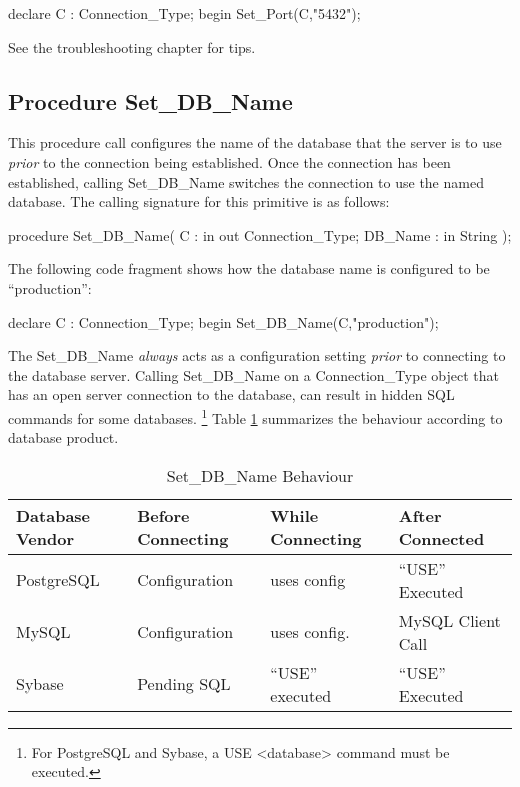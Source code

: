\documentclass[english,letterpaper]{book}
\begin{document}
\begin{Example}
declare
   C : Connection_Type;
begin
   Set_Port(C,"5432");
\end{Example}

See the troubleshooting chapter for tips.

\subsection{Procedure Set\_DB\_Name}

This procedure call configures the name of the database that the server
is to use \emph{prior} to the connection being established. Once
the connection has been established, calling Set\_DB\_Name switches the 
connection to use the named database.
The calling signature for this primitive is as follows:

\begin{Code}
procedure Set_DB_Name(
   C :       in out Connection_Type;
   DB_Name : in     String
);
\end{Code}

The following code fragment shows how the database name is configured
to be ``production'':

\begin{Example}
declare
   C : Connection_Type;
begin
   Set_DB_Name(C,"production");
\end{Example}

The Set\_DB\_Name \emph{always} acts as a configuration setting \emph{prior}
to connecting to the database server. Calling Set\_DB\_Name on a Connection\_Type
object that has an open server connection to the database, can result
in hidden SQL commands for some databases.%
\footnote{For PostgreSQL and Sybase, a USE <database> command must be executed.%
} Table \ref{t:setdb} summarizes the behaviour according to database product.

\begin{table}
   \begin{center}
      \begin{tabular}{llll}
      Database Vendor   &  Before Connecting &  While Connecting           &  After Connected\\
      \hline 
      PostgreSQL        &  Configuration     &  uses config     &  ``USE'' Executed\\
      MySQL             &  Configuration     &  uses config.    &  MySQL Client Call\\
      Sybase            &  Pending SQL       &  ``USE'' executed   &  ``USE'' Executed\\
      \end{tabular}
   \end{center}
   \caption{Set\_DB\_Name Behaviour}\label{t:setdb}
\end{table}
\end{document}
